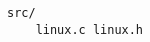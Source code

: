\clearpage
{}\label{emlinux}\secdown

\begin{verbatim}
src/
    linux.c linux.h
\end{verbatim}
    
\secup